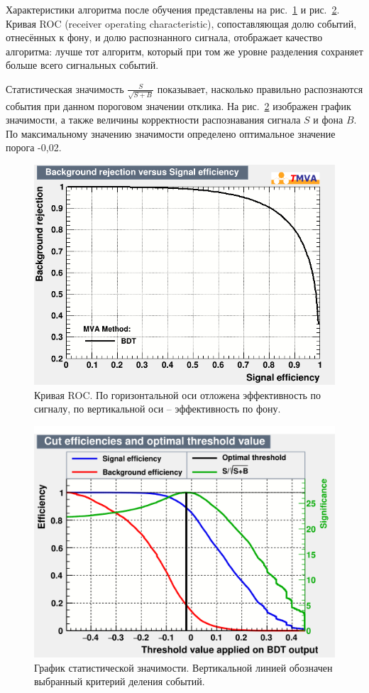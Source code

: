 \documentclass[14pt]{extarticle}
\begin{document}
Характеристики алгоритма после обучения представлены на рис.~\ref{fig:roc} и рис.~\ref{fig:significance}. Кривая ROC (receiver operating characteristic), сопоставляющая долю событий, отнесённых к фону, и долю распознанного сигнала, отображает качество алгоритма: лучше тот алгоритм, который при том же уровне разделения сохраняет больше всего сигнальных событий.

Статистическая значимость $\frac{S}{\sqrt{S+B}}$ показывает, насколько правильно распознаются события при данном пороговом значении отклика. На рис.~\ref{fig:significance} изображен график значимости, а также величины корректности распознавания сигнала $S$ и фона $B$. По максимальному значению значимости определено оптимальное значение порога -0,02.

\begin{figure}[h!]
	\centering
	\includegraphics[width=0.72\linewidth]{../pics/ROC.png}
	\caption{Кривая ROC. По горизонтальной оси отложена эффективность по сигналу, по вертикальной оси -- эффективность по фону.}
	\label{fig:roc}
\end{figure}

\begin{figure}[h!]
	\centering
	\includegraphics[width=0.72\linewidth]{../pics/significance.png}
	\caption{График статистической значимости. Вертикальной линией обозначен выбранный критерий деления событий.}
	\label{fig:significance}
\end{figure}
\end{document}
